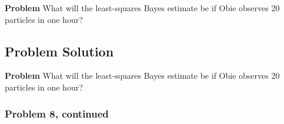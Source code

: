 \documentclass[12pt]{article}
\theoremstyle{definition}
\begin{document}
\bigskip
\noindent
{\bf Problem} What will the least-squares Bayes estimate be if Obie observes 20 particles in one hour?



\subsection*{Problem Solution}

\noindent
{\bf Problem} What will the least-squares Bayes estimate be if Obie observes 20 particles in one hour?

\newpage
\subsubsection*{Problem 8, continued}
\end{document}
